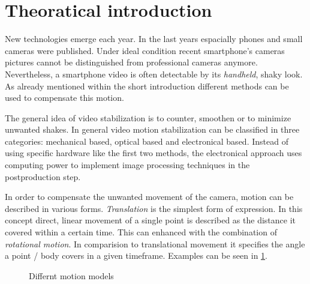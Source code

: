 \section{Theoratical introduction}
New technologies emerge each year. In the last years espacially phones and small cameras were published. Under ideal condition recent smartphone's cameras pictures cannot be distinguished from professional cameras anymore. Nevertheless, a smartphone video is often detectable by its \textit{handheld}, shaky look. As already mentioned within the short introduction different methods can be used to compensate this motion.

The general idea of video stabilization is to counter, smoothen or to minimize unwanted shakes. In general video motion stabilization can be classified in three categories: mechanical based, optical based and electronical based. Instead of using specific hardware like the first two methods, the electronical approach uses computing power to implement image processing techniques in the  postproduction step. \cite{blockTang}

In order to compensate the unwanted movement of the camera, motion can be described in various forms. \textit{Translation} is the simplest form of expression. In this concept direct, linear movement of a single point is described as the distance it covered within a certain time. This can enhanced with the combination of \textit{rotational motion}.  In comparision to translational movement it specifies the angle a point / body covers in a given timeframe. Examples can be seen in \cref{fig:motionmodels}.
\begin{figure}[h!]\centering
    \begin{minipage}{.45\textwidth}\centering
    \end{minipage}
    \begin{minipage}{.45\textwidth}\centering
    \end{minipage}
    \caption{Differnt motion models}
    \label{fig:motionmodels}
\end{figure}


